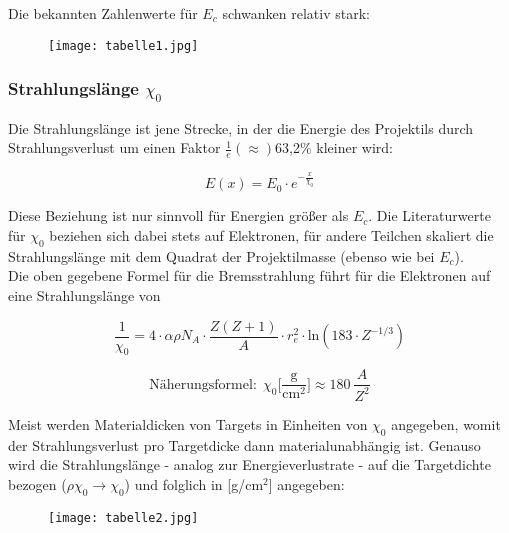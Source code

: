 Die bekannten Zahlenwerte für $E_c$ schwanken relativ stark:

\begin{figure}[H]
	\centering
	\texttt{[image: tabelle1.jpg]}
	\caption{}
	\label{}
\end{figure}

\subsubsection*{Strahlungslänge $\chi_0$}

Die Strahlungslänge ist jene Strecke, in der die Energie des Projektils durch Strahlungsverlust um
einen Faktor $\frac{1}{e}(\approx)$63,2\% kleiner wird:

\[E(x)=E_0\cdot e^{-\frac{x}{\chi_0}}\]

Diese Beziehung ist nur sinnvoll für Energien größer als $E_c$. Die Literaturwerte für $\chi_0$
beziehen sich dabei stets auf Elektronen, für andere Teilchen skaliert die Strahlungslänge mit dem
Quadrat der Projektilmasse (ebenso wie bei $E_c$).
\\
Die oben gegebene Formel für die Bremsstrahlung führt für die Elektronen auf eine Strahlungslänge
von 

\[\frac{1}{\chi_0}=4\cdot\alpha \rho N_A \cdot\frac{Z(Z+1)}{A}\cdot
r_e^2\cdot\text{ln}\left(183\cdot Z^{-1/3}\right)\]

\[\text{Näherungsformel:}~~\chi_0\bigg[\frac{\text{g}}{\text{cm}^2}\bigg] \approx
180~\frac{A}{Z^2}\] 

Meist werden Materialdicken von Targets in Einheiten von $\chi_0$ angegeben, womit der
Strahlungsverlust pro Targetdicke dann materialunabhängig ist. Genauso wird die Strahlungslänge -
analog zur Energieverlustrate - auf die Targetdichte bezogen ($\rho \chi_0\rightarrow\chi_0$) und
folglich in [g/cm$^2$] angegeben:

\begin{figure}[H]
	\centering
	\texttt{[image: tabelle2.jpg]}
\end{figure}
